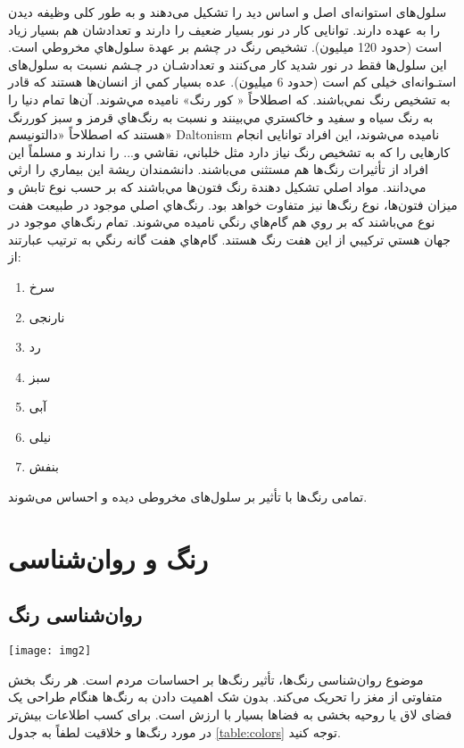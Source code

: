 \documentclass[12pt]{report}
\begin{document}
سلول‌های استوانه‌ای اصل و اساس ديد را تشکیل می‌دهند و به طور کلی وظیفه دیدن را به عهده دارند. توانایی کار در نور بسيار ضعيف را دارند و تعدادشان هم بسیار زیاد است (حدود 120 میلیون). 
تشخيص رنگ در چشم بر عهدة سلول‌هاي مخروطي است. این سلول‌ها فقط در نور شدید کار می‌کنند و تعدادشـان در چـشم نسبت به سلول‌های استـوانه‌ای خیلی کم است (حدود 6 میلیون). 
عده بسيار كمي از انسان‌ها هستند كه قادر به تشخيص رنگ نمي‌باشند. که اصطلاحاً « كور رنگ» ناميده مي‌شوند. آن‌ها تمام دنيا را به رنگ سياه و سفيد و خاكستري مي‌بينند و نسبت به رنگ‌هاي قرمز و سبز کوررنگ هستند که اصطلاحاً «دالتونيسم» Daltonism ناميده مي‌شوند، این افراد توانایی انجام کارهایی را که به تشخیص رنگ نیاز دارد مثل خلباني، نقاشي و... را ندارند و مسلماً این افراد از تأثیرات رنگ‌ها هم مستثنی می‌باشند. دانشمندان ريشة اين بيماري را ارثي مي‌دانند.
مواد اصلي تشكيل دهندة رنگ فتون‌ها مي‌باشند كه بر حسب نوع تابش و ميزان فتون‌ها، نوع رنگ‌ها نيز متفاوت خواهد بود. رنگ‌هاي اصلي موجود در طبيعت هفت نوع مي‌باشند كه بر روي هم گام‌هاي رنگي ناميده مي‌شوند. تمام رنگ‌هاي موجود در جهان هستي تركيبي از اين هفت رنگ هستند. گام‌هاي هفت گانه رنگي به ترتيب عبارتند از:
\begin{enumerate}
\item سرخ
\item نارنجی
\item رد
\item سبز
\item آبی
\item نیلی
\item بنفش
\end{enumerate}
تمامی رنگ‌ها با تأثیر بر سلول‌های مخروطی دیده و احساس می‌شوند.

\part{رنگ و روان‌شناسی}

\chapter{روان‌شناسی رنگ}
\begin{center}
\texttt{[image: img2]}
\end{center}

موضوع روان‌شناسی رنگ‌ها، تأثیر رنگ‌ها بر احساسات مردم است. هر رنگ بخش متفاوتی از مغز را تحریک می‌کند. بدون شک اهمیت دادن به رنگ‌ها هنگام طراحی یک فضای لاق یا روحیه بخشی به فضاها بسیار با ارزش است. 
برای کسب اطلاعات بیش‌تر در مورد رنگ‌ها و خلاقیت لطفاً به جدول  \ref{table:colors}  توجه کنید.
\end{document}
